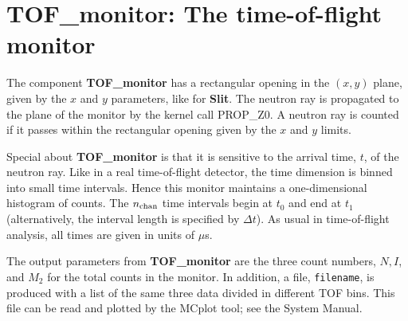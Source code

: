 \section{TOF\_monitor: The time-of-flight monitor}

The component {\bf TOF\_monitor} has a rectangular opening
in the $(x,y)$ plane, given by the $x$ and $y$ parameters,
like for {\bf Slit}.
The neutron ray is propagated to the plane of the monitor
by the kernel call PROP\_Z0.
A neutron ray is counted if it passes within the rectangular opening 
given by the $x$ and $y$ limits.

Special about {\bf TOF\_monitor} is that it is sensitive to
the arrival time, $t$, of the neutron ray.
Like in a real time-of-flight detector, the time dimension is
binned into small time intervals.
Hence this monitor maintains a one-dimensional histogram of counts.
The $n_{\rm chan}$ time intervals begin at $t_0$ and
end at $t_1$ (alternatively, the interval length is specified by $\Delta t$).
As usual in time-of-flight analysis, all times are given in units of $\mu$s.

The output parameters from {\bf TOF\_monitor} are the three count numbers,
$N, I$, and $M_2$ for the total counts in the monitor.
In addition, a file, \verb+filename+, is produced with a list of 
the same three data divided in different TOF bins.
This file can be read and plotted by the {\rm MCplot} tool; see the
System Manual.

